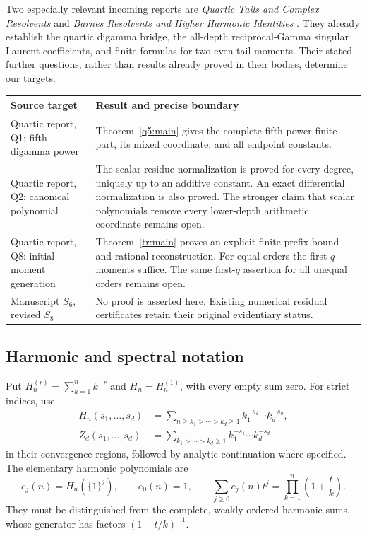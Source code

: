 \documentclass[11pt,a4paper]{article}
\numberwithin{equation}{section}
\theoremstyle{definition}
\begin{document}
Two especially relevant incoming reports are \emph{Quartic Tails and
Complex Resolvents} and \emph{Barnes Resolvents and Higher Harmonic Identities}
\cite{Quartic,Barnes}. They already establish the quartic digamma bridge,
the all-depth reciprocal-Gamma singular Laurent coefficients, and finite
formulas for two-even-tail moments. Their stated further questions,
rather than results already proved in their bodies, determine our targets.

\begin{center}
\small
\begin{tabular}{@{}>{\raggedright\arraybackslash}p{}>{\raggedright\arraybackslash}p{}@{}}
\toprule
Source target & Result and precise boundary \\
\midrule
Quartic report, Q1: fifth digamma power &
Theorem~\ref{q5:main} gives the complete fifth-power finite part, its
mixed coordinate, and all endpoint constants. \\[5pt]
Quartic report, Q2: canonical polynomial &
The scalar residue normalization is proved for every degree, uniquely
up to an additive constant. An exact differential normalization is also
proved. The stronger claim that scalar polynomials remove every
lower-depth arithmetic coordinate remains open. \\[5pt]
Quartic report, Q8: initial-moment generation &
Theorem~\ref{tr:main} proves an explicit finite-prefix bound and rational
reconstruction. For equal orders the first $q$ moments suffice. The
same first-$q$ assertion for all unequal orders remains open. \\[5pt]
Manuscript $S_6$, revised $S_8$ &
No proof is asserted here. Existing numerical residual certificates
retain their original evidentiary status. \\
\bottomrule
\end{tabular}
\end{center}

\subsection{Harmonic and spectral notation}

Put $H_n^{(r)}=\sum_{k=1}^n k^{-r}$ and $H_n=H_n^{(1)}$, with every
empty sum zero. For strict indices, use
\begin{align}
 H_n(s_1,\ldots,s_d)&=
 \sum_{n\ge k_1>\cdots>k_d\ge1}k_1^{-s_1}\cdots k_d^{-s_d},\\
 Z_d(s_1,\ldots,s_d)&=
 \sum_{k_1>\cdots>k_d\ge1}k_1^{-s_1}\cdots k_d^{-s_d}
 \label{eq:strictzeta}
\end{align}
in their convergence regions, followed by analytic continuation where
specified. The elementary harmonic polynomials are
\begin{equation}\label{eq:edef}
 e_j(n)=H_n(\{1\}^j),\qquad e_0(n)=1,
 \qquad \sum_{j\ge0}e_j(n)t^j=\prod_{k=1}^n\left(1+\frac tk\right).
\end{equation}
They must be distinguished from the complete, weakly ordered harmonic
sums, whose generator has factors $(1-t/k)^{-1}$.
\end{document}
